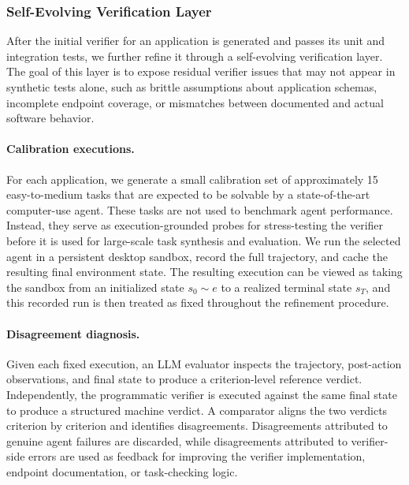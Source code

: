 \subsubsection{Self-Evolving Verification Layer}
\label{sec:self-evolving-verification}
After the initial verifier for an application is generated and passes its
unit and integration tests, we further refine it through a
self-evolving verification layer. The goal of this layer is to expose
residual verifier issues that may not appear in synthetic tests alone, such
as brittle assumptions about application schemas, incomplete endpoint
coverage, or mismatches between documented and actual software behavior.

\paragraph{Calibration executions.} For each application, we generate a small calibration set of approximately
15 easy-to-medium tasks that are expected to be solvable by a
state-of-the-art computer-use agent. These tasks are not used to benchmark
agent performance. Instead, they serve as execution-grounded probes for
stress-testing the verifier before it is used for large-scale task synthesis
and evaluation. We run the selected agent in a persistent desktop sandbox,
record the full trajectory, and cache the resulting final environment state.
The resulting execution can be viewed as taking the sandbox from an initialized
state $s_0 \sim e$ to a realized terminal state $s_T$, and this recorded run is
then treated as fixed throughout the refinement procedure.

\paragraph{Disagreement diagnosis.} Given each fixed execution, an LLM evaluator inspects the trajectory,
post-action observations, and final state to produce a criterion-level
reference verdict. Independently, the programmatic verifier is executed
against the same final state to produce a structured machine verdict. A
comparator aligns the two verdicts criterion by criterion and identifies
disagreements. Disagreements attributed to genuine agent failures are
discarded, while disagreements attributed to verifier-side errors are used as
feedback for improving the verifier implementation, endpoint documentation,
or task-checking logic.

